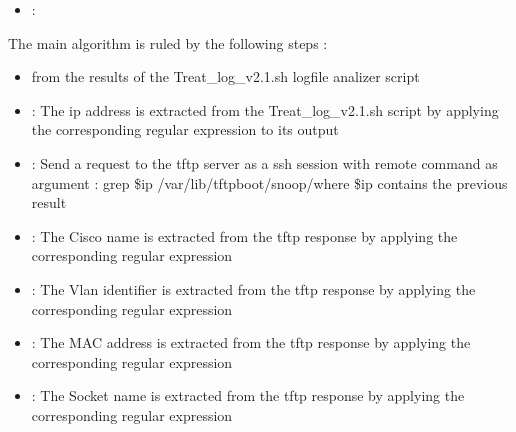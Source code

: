 \documentclass[letterpaper,10pt,english]{sphinxmanual}
\begin{document}
\begin{itemize}
\begin{itemize}
\item {} 
\sphinxAtStartPar
{} : 

\end{itemize}

\item {} 
\sphinxAtStartPar
{} : 

\end{itemize}

\sphinxAtStartPar
The main algorithm is ruled by the following steps :
\begin{itemize}
\item {} 
\sphinxAtStartPar
{} from the results of the Treat\_log\_v2.1.sh logfile analizer script

\item {} 
\sphinxAtStartPar
{} : The ip address is extracted from the Treat\_log\_v2.1.sh script by applying the corresponding regular expression to its output

\item {} 
\sphinxAtStartPar
{} : Send a request to the tftp server as a ssh session with remote command as argument : grep \$ip /var/lib/tftpboot/snoop/where \$ip contains the previous result

\item {} 
\sphinxAtStartPar
{} : The Cisco name is extracted from the tftp response by applying the corresponding regular expression

\item {} 
\sphinxAtStartPar
{} : The Vlan identifier is extracted from the tftp response by applying the corresponding regular expression

\item {} 
\sphinxAtStartPar
{} : The MAC address is extracted from the tftp response by applying the corresponding regular expression

\item {} 
\sphinxAtStartPar
{} : The Socket name is extracted from the tftp response by applying the corresponding regular expression


\end{itemize}
\end{document}
